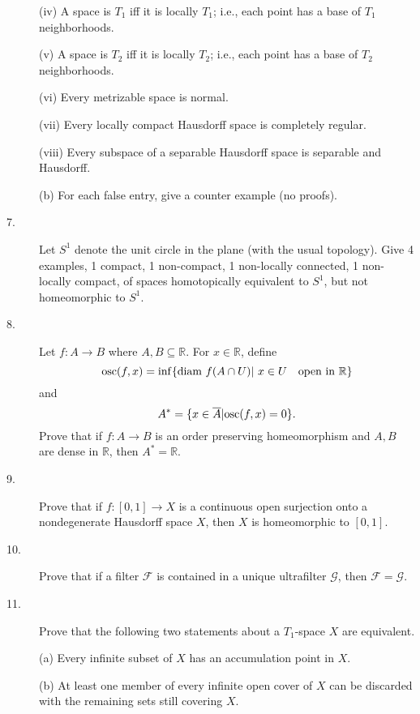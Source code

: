 \documentclass{article}
\def\R{\mathbb R}
\begin{document}
\begin{description}
\item[\qquad] (iv)
A space is $T_1$ iff it is locally $T_1$; i.e., each point has a base of
$T_1$ neighborhoods.

\item[\qquad] (v)
A space is $T_2$ iff it is locally $T_2$; i.e., each point has a base of
$T_2$ neighborhoods.

\item[\qquad] (vi)
Every metrizable space is normal.

\item[\qquad] (vii)
Every locally compact Hausdorff space is completely regular.

\item[\qquad] (viii)
Every subspace of a separable Hausdorff space is separable and Hausdorff.

\item[\quad] (b)
For each false entry, give a counter example (no proofs).

\item[7.]
Let $S^1$ denote the unit circle in the plane (with the usual topology). Give
4 examples, 1 compact, 1 non-compact, 1 non-locally connected, 1 non-locally
compact, of spaces homotopically equivalent to $S^1$, but not homeomorphic
to $S^1$.

\item[8.]
Let $f: A \to B$ where $A, B \subseteq \R$. For $x \in \R$, define
$$\hbox{osc} (f, x) = \inf \{\hbox{diam\ } f (A \cap U) | \ x \in U \quad
  \hbox{open\ } \hbox{in\ } \R\}$$
and
$$A^\ast = \{x \in  \overline A | \hbox{osc} (f,x) = 0\}.$$
Prove that if $f: A \to B$ is an order preserving homeomorphism and
$A, B$ are dense in $\R$, then $A^\ast = \R$.

\item[9.]
Prove that if $f : [0,1] \to X$ is a continuous open surjection onto a
nondegenerate Hausdorff space $X$, then $X$ is homeomorphic to $[0,1]$.

\item[10.]
Prove that if a filter $\mathcal F$ is contained in a unique ultrafilter
$\mathcal G$, then $\mathcal F = \mathcal G$.

\item[11.]
Prove that the following two statements about a $T_1$-space $X$ are
equivalent.

\item[\quad] (a)
Every infinite subset of $X$ has an accumulation point in $X$.

\item[\quad] (b)
At least one member of every infinite open cover of $X$ can be discarded with
the remaining sets still covering $X$.


\end{description}
\end{document}
